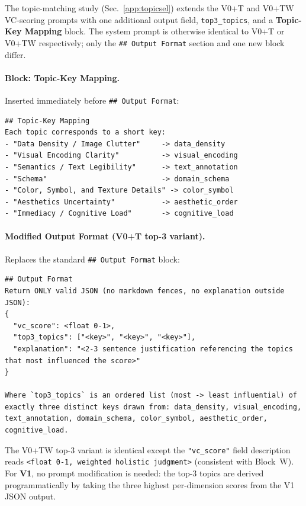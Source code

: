 The topic-matching study (Sec.~\ref{app:topicsel}) extends the V0+T and
V0+TW VC-scoring prompts with one additional output field,
\texttt{top3\_topics}, and a \textbf{Topic-Key Mapping} block. The system
prompt is otherwise identical to V0+T or V0+TW respectively; only the
\texttt{\#\#~Output~Format} section and one new block differ.

\paragraph{Block: Topic-Key Mapping.}
Inserted immediately before \texttt{\#\#~Output~Format}:

\begin{lstlisting}
## Topic-Key Mapping
Each topic corresponds to a short key:
- "Data Density / Image Clutter"     -> data_density
- "Visual Encoding Clarity"          -> visual_encoding
- "Semantics / Text Legibility"      -> text_annotation
- "Schema"                           -> domain_schema
- "Color, Symbol, and Texture Details" -> color_symbol
- "Aesthetics Uncertainty"           -> aesthetic_order
- "Immediacy / Cognitive Load"       -> cognitive_load
\end{lstlisting}

\paragraph{Modified Output Format (V0+T top-3 variant).}
Replaces the standard \texttt{\#\#~Output~Format} block:

\begin{lstlisting}
## Output Format
Return ONLY valid JSON (no markdown fences, no explanation outside JSON):
{
  "vc_score": <float 0-1>,
  "top3_topics": ["<key>", "<key>", "<key>"],
  "explanation": "<2-3 sentence justification referencing the topics that most influenced the score>"
}

Where `top3_topics` is an ordered list (most -> least influential) of exactly three distinct keys drawn from: data_density, visual_encoding, text_annotation, domain_schema, color_symbol, aesthetic_order, cognitive_load.
\end{lstlisting}

\noindent The V0+TW top-3 variant is identical except the \texttt{"vc\_score"} field description reads \texttt{<float~0-1,~weighted~holistic~judgment>} (consistent with Block~W). For \textbf{V1}, no prompt modification is needed: the top-3 topics are derived programmatically by taking the three highest per-dimension scores from the V1 JSON output.

